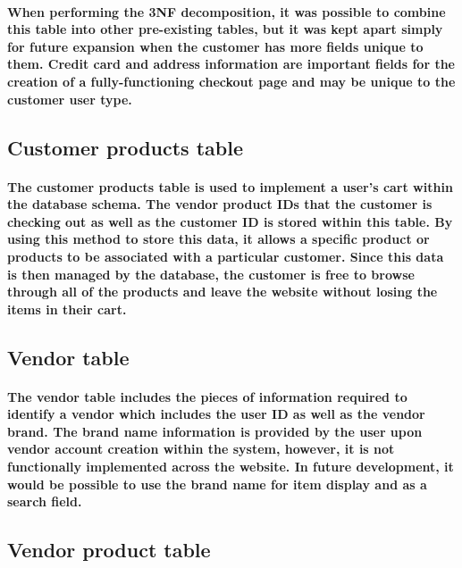 \documentclass[sigconf]{acmart}
\begin{document}
\paragraph{When performing the 3NF decomposition, it was possible to combine this table into other pre-existing tables, but it was kept apart simply for future expansion when the customer has more fields unique to them. Credit card and address information are important fields for the creation of a fully-functioning checkout page and may be unique to the customer user type. }

\subsection{Customer products table}

\paragraph{The customer products table is used to implement a user's cart within the database schema. The vendor product IDs that the customer is checking out as well as the customer ID is stored within this table. By using this method to store this data, it allows a specific product or products to be associated with a particular customer. Since this data is then managed by the database, the customer is free to browse through all of the products and leave the website without losing the items in their cart. }


\subsection{Vendor table}

\paragraph{The vendor table includes the pieces of information required to identify a vendor which includes the user ID as well as the vendor brand. The brand name information is provided by the user upon vendor account creation within the system, however, it is not functionally implemented across the website. In future development, it would be possible to use the brand name for item display and as a search field.}

\subsection{Vendor product table}
\end{document}
